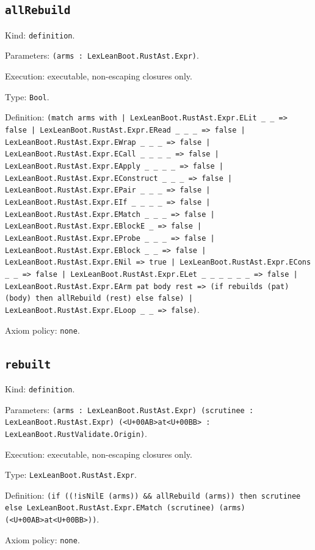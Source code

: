 \documentclass[11pt]{article}
\begin{document}
\subsection*{\texttt{allRebuild}}
\noindent Kind: \texttt{definition}.\par
\noindent Parameters: \texttt{(arms : LexLeanBoot.RustAst.Expr)}.\par
\noindent Execution: executable, non-escaping closures only.\par
\noindent Type: \texttt{Bool}.\par
\noindent Definition: \texttt{(match arms with | LexLeanBoot.RustAst.Expr.ELit \_ \_ => false | LexLeanBoot.RustAst.Expr.ERead \_ \_ \_ => false | LexLeanBoot.RustAst.Expr.EWrap \_ \_ \_ => false | LexLeanBoot.RustAst.Expr.ECall \_ \_ \_ \_ => false | LexLeanBoot.RustAst.Expr.EApply \_ \_ \_ \_ => false | LexLeanBoot.RustAst.Expr.EConstruct \_ \_ \_ => false | LexLeanBoot.RustAst.Expr.EPair \_ \_ \_ => false | LexLeanBoot.RustAst.Expr.EIf \_ \_ \_ \_ => false | LexLeanBoot.RustAst.Expr.EMatch \_ \_ \_ => false | LexLeanBoot.RustAst.Expr.EBlockE \_ => false | LexLeanBoot.RustAst.Expr.EProbe \_ \_ \_ => false | LexLeanBoot.RustAst.Expr.EBlock \_ \_ => false | LexLeanBoot.RustAst.Expr.ENil => true | LexLeanBoot.RustAst.Expr.ECons \_ \_ => false | LexLeanBoot.RustAst.Expr.ELet \_ \_ \_ \_ \_ \_ => false | LexLeanBoot.RustAst.Expr.EArm pat body rest => (if rebuilds (pat) (body) then allRebuild (rest) else false) | LexLeanBoot.RustAst.Expr.ELoop \_ \_ => false)}.\par
\noindent Axiom policy: \texttt{none}.\par
\subsection*{\texttt{rebuilt}}
\noindent Kind: \texttt{definition}.\par
\noindent Parameters: \texttt{(arms : LexLeanBoot.RustAst.Expr) (scrutinee : LexLeanBoot.RustAst.Expr) (<U+00AB>at<U+00BB> : LexLeanBoot.RustValidate.Origin)}.\par
\noindent Execution: executable, non-escaping closures only.\par
\noindent Type: \texttt{LexLeanBoot.RustAst.Expr}.\par
\noindent Definition: \texttt{(if ((!isNilE (arms)) \&\& allRebuild (arms)) then scrutinee else LexLeanBoot.RustAst.Expr.EMatch (scrutinee) (arms) (<U+00AB>at<U+00BB>))}.\par
\noindent Axiom policy: \texttt{none}.\par
\end{document}
